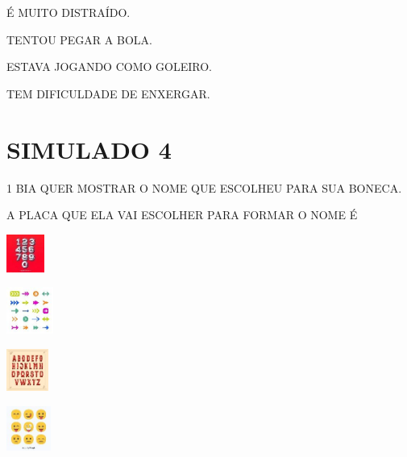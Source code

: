 \begin{escolha}
\item É MUITO DISTRAÍDO.

\item TENTOU PEGAR A BOLA. 

\item ESTAVA JOGANDO COMO GOLEIRO.

\item TEM DIFICULDADE DE ENXERGAR.
\end{escolha}

\chapter{SIMULADO 4}

\num{1} BIA QUER MOSTRAR O NOME QUE ESCOLHEU PARA SUA BONECA.

A PLACA QUE ELA VAI ESCOLHER PARA FORMAR O NOME É

\begin{escolha}
\item \includegraphics[width=0.48889in,height=0.48889in]{media/image239.jpg}

\item \includegraphics[width=0.60625in,height=0.60625in]{media/image240.jpg}

\item \includegraphics[width=0.54236in,height=0.54236in]{media/image241.jpg}

\item \includegraphics[width=0.57431in,height=0.57431in]{media/image242.jpg}
\end{escolha}


